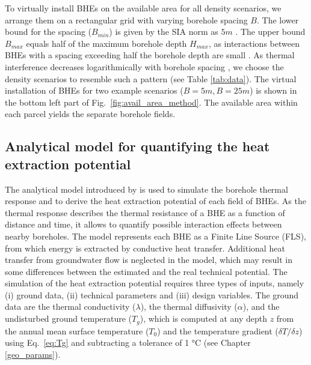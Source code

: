 To virtually install BHEs on the available area for all density scenarios, we arrange them on a rectangular grid with varying borehole spacing $B$.
The lower bound for the spacing ($B_{min}$) is given by the SIA norm as $5m$ \cite{sia_sondes_2010}.
The upper bound $B_{max}$ equals half of the maximum borehole depth $H_{max}$, as interactions between BHEs with a spacing exceeding half the borehole depth are small \cite{pahud_geothermal_2002}. 
As thermal interference decreases logarithmically with borehole spacing \cite{eskilson_thermal_1987}, we choose the density scenarios to resemble such a pattern (see Table \ref{tab:data}).
The virtual installation of BHEs for two example scenarios ($B = 5m, B = 25m$) is shown in the bottom left part of Fig.~\ref{fig:avail_area_method}. 
The available area within each parcel yields the separate borehole fields.

\subsection{Analytical model for quantifying the heat extraction potential}
\label{model}

The analytical model introduced by \citet{eskilson_thermal_1987} is used to simulate the borehole thermal response and to derive the heat extraction potential of each field of BHEs.
As the thermal response describes the thermal resistance of a BHE as a function of distance and time, it allows to quantify possible interaction effects between nearby boreholes.
The model represents each BHE as a Finite Line Source (FLS), from which energy is extracted by conductive heat transfer.
Additional heat transfer from groundwater flow is neglected in the model, which may result in some differences between the estimated and the real technical potential.
The simulation of the heat extraction potential requires three types of inputs, namely (i) ground data, (ii) technical parameters and (iii) design variables.
The ground data 
are the thermal conductivity ($\lambda$), the thermal diffusivity ($\alpha$), and the undisturbed ground temperature ($T_g$), which is computed at any depth $z$ from the annual mean surface temperature ($T_0$) and the temperature gradient ($\delta T/\delta z$) using Eq.~\ref{eq:Tg} and subtracting a tolerance of 1 °C (see Chapter \ref{geo_params}).

\begin{comment}
as \cite{sia_sondes_2010}:


\begin{equation}
\label{eq:Tg}
    T_g(z) = T_0 + z \times \frac{\delta T}{\delta z} - 1 ^\circ C
\end{equation}

where the $1 ^\circ C$ is a tolerance that is subtracted to account for uncertainties in the estimation of $T_0$.
\end{comment}

